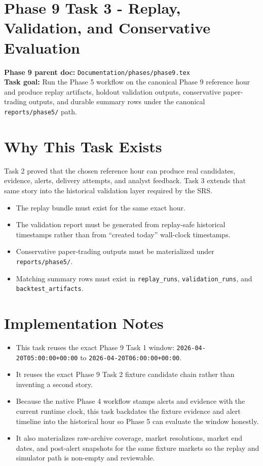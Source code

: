 \documentclass{article}
\begin{document}
\section*{Phase 9 Task 3 - Replay, Validation, and Conservative Evaluation}

\textbf{Phase 9 parent doc:} \texttt{Documentation/phases/phase9.tex}\\
\textbf{Task goal:} Run the Phase 5 workflow on the canonical Phase 9 reference hour and produce replay artifacts, holdout validation outputs, conservative paper-trading outputs, and durable summary rows under the canonical \texttt{reports/phase5/} path.

\section*{Why This Task Exists}
Task 2 proved that the chosen reference hour can produce real candidates, evidence, alerts, delivery attempts, and analyst feedback. Task 3 extends that same story into the historical validation layer required by the SRS.
\begin{itemize}
\item The replay bundle must exist for the same exact hour.
\item The validation report must be generated from replay-safe historical timestamps rather than from ``created today'' wall-clock timestamps.
\item Conservative paper-trading outputs must be materialized under \texttt{reports/phase5/}.
\item Matching summary rows must exist in \texttt{replay\_runs}, \texttt{validation\_runs}, and \texttt{backtest\_artifacts}.
\end{itemize}

\section*{Implementation Notes}
\begin{itemize}
\item This task reuses the exact Phase 9 Task 1 window: \texttt{2026-04-20T05:00:00+00:00} to \texttt{2026-04-20T06:00:00+00:00}.
\item It reuses the exact Phase 9 Task 2 fixture candidate chain rather than inventing a second story.
\item Because the native Phase 4 workflow stamps alerts and evidence with the current runtime clock, this task backdates the fixture evidence and alert timeline into the historical hour so Phase 5 can evaluate the window honestly.
\item It also materializes raw-archive coverage, market resolutions, market end dates, and post-alert snapshots for the same fixture markets so the replay and simulator path is non-empty and reviewable.
\end{itemize}
\end{document}
